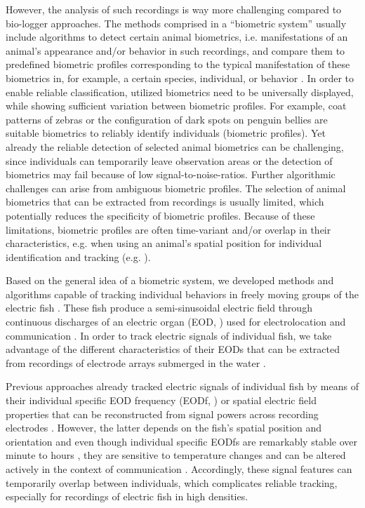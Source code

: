 However, the analysis of such recordings is way more challenging compared to bio-logger approaches. The methods comprised in a ``biometric system'' usually include algorithms to detect certain animal biometrics, i.e. manifestations of an animal's appearance and/or behavior in such recordings, and compare them to predefined biometric profiles corresponding to the typical manifestation of these biometrics in, for example, a certain species, individual, or behavior \citep{Gaston2004, Sherley2010, Kuhl2013}. In order to enable reliable classification, utilized biometrics need to be universally displayed, while showing sufficient variation between biometric profiles. For example, coat patterns of zebras \citep{Lahiri2011} or the configuration of dark spots on penguin bellies \citep{Sherley2010} are suitable biometrics to reliably identify individuals (biometric profiles). Yet already the reliable detection of selected animal biometrics can be challenging, since individuals can temporarily leave observation areas or the detection of biometrics may fail because of low signal-to-noise-ratios. Further algorithmic challenges can arise from ambiguous biometric profiles. The selection of animal biometrics that can be extracted from recordings is usually limited, which potentially reduces the specificity of biometric profiles. Because of these limitations, biometric profiles are often time-variant and/or overlap in their characteristics, e.g. when using an animal's spatial position for individual identification and tracking (e.g. \citealp{Madhav2018}).

Based on the general idea of a biometric system, we developed methods and algorithms capable of tracking individual behaviors in freely moving groups of the electric fish \Lepto{}. These fish produce a semi-sinusoidal electric field through continuous discharges of an electric organ (EOD, \citealp{Turner2007}) used for electrolocation \citep{Fotowat2013} and communication \citep{Albert2005, Smith2013}. In order to track electric signals of individual fish, we take advantage of the different characteristics of their EODs that can be extracted from recordings of electrode arrays submerged in the water \citep{Jun2013, Madhav2018, Henninger2018, Raab2019}. 

Previous approaches already tracked electric signals of individual fish by means of their individual specific EOD frequency (EODf, \citealp{Henninger2020}) or spatial electric field properties that can be reconstructed from signal powers across recording electrodes \citep{Madhav2018}. However, the latter depends on the fish's spatial position and orientation and even though individual specific EODfs are remarkably stable over minute to hours \citep{Moortgat1998}, they are sensitive to temperature changes and can be altered actively in the context of communication \citep{Dunlap2000, Smith2013}. Accordingly, these signal features can temporarily overlap between individuals, which complicates reliable tracking, especially for recordings of electric fish in high densities.

